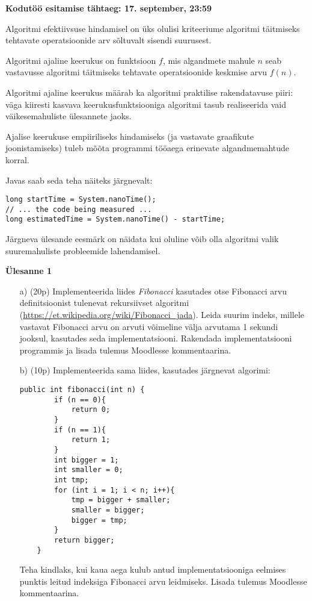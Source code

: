 \documentclass[a4paper]{article}
\begin{document}
\textbf{Kodutöö esitamise tähtaeg: 17. september, 23:59}

Algoritmi efektiivsuse hindamisel on üks olulisi kriteeriume algoritmi
täitmiseks tehtavate operatsioonide arv sõltuvalt sisendi suurusest.


Algoritmi ajaline keerukus on funktsioon $f$, mis algandmete
mahule $n$ seab vastavusse algoritmi täitmiseks tehtavate operatsioonide keskmise arvu $f(n)$. 

Algoritmi ajaline keerukus määrab ka algoritmi praktilise
rakendatavuse piiri: väga kiiresti kasvava keerukusfunktsiooniga
algoritmi tasub realiseerida vaid väikesemahuliste ülesannete jaoks.

Ajalise keerukuse empiiriliseks hindamiseks (ja vastavate graafikute
joonistamiseks) tuleb mõõta programmi tööaega erinevate algandmemahtude
korral.

Javas saab seda teha näiteks järgnevalt:

\begin{lstlisting}
long startTime = System.nanoTime();    
// ... the code being measured ...    
long estimatedTime = System.nanoTime() - startTime;
\end{lstlisting}

Järgneva ülesande eesmärk on näidata kui oluline võib olla algoritmi valik suuremahuliste probleemide lahendamisel.
\begin{problem}
\textbf{Ülesanne 1}
\begin{enumerate}
   \item[a)] (20p) Implementeerida liides \textit{Fibonacci} kasutades otse Fibonacci arvu definitsioonist tulenevat rekursiivset algoritmi (\url{https://et.wikipedia.org/wiki/Fibonacci_jada}). Leida suurim indeks, millele vastavat Fibonacci arvu on 
arvuti võimeline välja arvutama 1 sekundi jooksul, kasutades seda implementatsiooni. Rakendada implementatsiooni programmis ja lisada tulemus Moodlesse kommentaarina. 
    \item[b)] (10p) Implementeerida sama liides, kasutades järgnevat algorimi: 
\begin{lstlisting}
public int fibonacci(int n) {
        if (n == 0){
            return 0;
        }
        if (n == 1){
            return 1;
        }
        int bigger = 1;
        int smaller = 0;
        int tmp;
        for (int i = 1; i < n; i++){
            tmp = bigger + smaller;
            smaller = bigger;
            bigger = tmp;
        }
        return bigger;
    }
\end{lstlisting}
Teha kindlaks, kui kaua aega kulub antud implementatsiooniga eelmises punktis leitud indeksiga Fibonacci arvu leidmiseks. Lisada tulemus Moodlesse kommentaarina.

\end{enumerate}

\end{problem}
\end{document}
